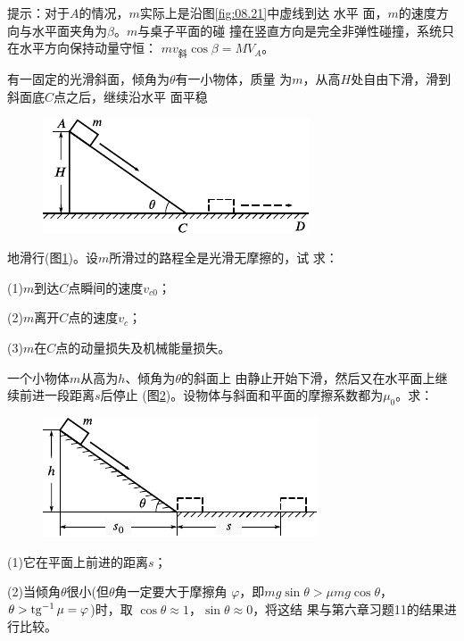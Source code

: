 \begin{exercises}
\lhbrak 提示：对于$ A $的情况，$ m $实际上是沿图\ref{fig:08.21}中虚线到达
水平
面，$ m $的速度方向与水平面夹角为$ \beta $。$ m $与桌子平面的碰
撞在竖直方向是完全非弹性碰撞，系统只在水平方向保持动量守恒：
$ m v _ \text {斜} \cos \beta = M V _ { A }$。\rhbrak

\exercise 有一固定的光滑斜面，倾角为$ \theta $有一小物体，质量
为$ m $，从高$ H $处自由下滑，滑到斜面底$ C $点之后，继续沿水平
面平稳
\begin{figure}
  \centering
  \includegraphics{figure/fig08.22}
  \caption{}
  \label{fig:08.22}
\end{figure}
地滑行(图\ref{fig:08.22})。设$ m $所滑过的路程全是光滑无摩擦的，试
求：

(1)\;$ m $到达$ C $点瞬间的速度$ v _ { c 0 } $；

(2)\;$ m $离开$ C $点的速度$ v _ { c } $；

(3)\;$ m $在$ C $点的动量损失及机械能量损失。

\exercise 一个小物体$ m $从高为$ h $、倾角为$ \theta $的斜面上
由静止开始下滑，然后又在水平面上继续前进一段距离$ s $后停止
(图\ref{fig:08.23})。设物体与斜面和平面的摩擦系数都为$ \mu _ { 0 } $。求：

\begin{figure}
  \centering
  \includegraphics{figure/fig08.23}
  \caption{}
  \label{fig:08.23}
\end{figure}
(1)它在平面上前进的距离$ s $；

(2)当倾角$ \theta $很小(但$ \theta $角一定要大于摩擦角
$ \varphi $，即$ m g \sin \theta > \mu m g \cos \theta $，
$ \theta > \operatorname{tg} ^ { -1 } \mu = \varphi $)时，取
$ \cos \theta \approx 1 $，$\sin \theta \approx 0 $，将这结
果与第六章习题11的结果进行比较。


\end{exercises}

